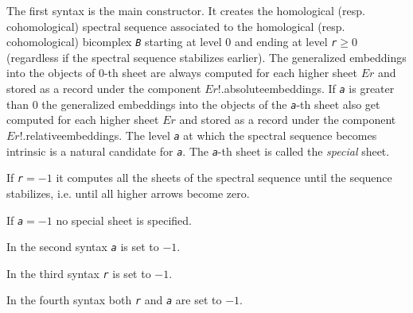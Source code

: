 \documentclass[a4paper,11pt]{report}
\begin{document}
{{{ The first syntax is the main constructor. It creates the homological (resp.
cohomological) spectral sequence associated to the homological (resp.
cohomological) bicomplex \mbox{\texttt{\mdseries\slshape B}} starting at level $0$ and ending at level \mbox{\texttt{\mdseries\slshape r}}$\geq 0$ (regardless if the spectral sequence stabilizes earlier). The generalized
embeddings into the objects of 0-th sheet are always computed for each higher
sheet $Er$ and stored as a record under the component $Er$!.absolute{\textunderscore}embeddings. If \mbox{\texttt{\mdseries\slshape a}} is greater than $0$ the generalized embeddings into the objects of the \mbox{\texttt{\mdseries\slshape a}}-th sheet also get computed for each higher sheet $Er$ and stored as a record under the component $Er$!.relative{\textunderscore}embeddings. The level \mbox{\texttt{\mdseries\slshape a}} at which the spectral sequence becomes intrinsic is a natural candidate for \mbox{\texttt{\mdseries\slshape a}}. The \mbox{\texttt{\mdseries\slshape a}}-th sheet is called the \emph{special} sheet. 

 If \mbox{\texttt{\mdseries\slshape r}}$=-1$ it computes all the sheets of the spectral sequence until the sequence
stabilizes, i.e. until all higher arrows become zero. 

 If \mbox{\texttt{\mdseries\slshape a}}$=-1$ no special sheet is specified. 

 In the second syntax \mbox{\texttt{\mdseries\slshape a}} is set to $-1$. 

 In the third syntax \mbox{\texttt{\mdseries\slshape r}} is set to $-1$. 

 In the fourth syntax both \mbox{\texttt{\mdseries\slshape r}} and \mbox{\texttt{\mdseries\slshape a}} are set to $-1$. 

}}}
\end{document}
